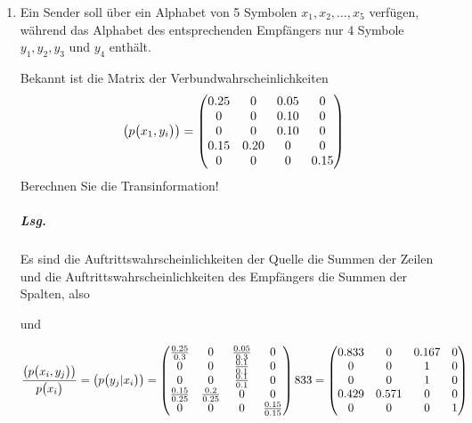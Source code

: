 \documentclass{scrreprt}
\begin{document}
\begin{enumerate}[1.]
\newpage
\setcounter{enumi}{4}
\item Ein Sender soll über ein Alphabet von 5 Symbolen $x_1, x_2, \ldots, x_5$
  verfügen,
  während das Alphabet des entsprechenden Empfängers nur 4 Symbole $y_1, y_2, y_3$
  und $y_4$ enthält.

  Bekannt ist die Matrix der Verbundwahrscheinlichkeiten
  \[
    \qty(p\qty\big(x_1, y_i)) = \begin{pmatrix}
      0.25 & 0    & 0.05 & 0    \\
      0    & 0    & 0.10 & 0    \\
      0    & 0    & 0.10 & 0    \\
      0.15 & 0.20 & 0    & 0    \\
      0    & 0    & 0    & 0.15 \\
    \end{pmatrix}
  \]
  Berechnen Sie die Transinformation!

  \subparagraph{Lsg.} Es sind die Auftrittswahrscheinlichkeiten der Quelle die
  Summen der Zeilen und die Auftrittswahrscheinlichkeiten des Empfängers die
  Summen der Spalten, also
  und

  \[
    \frac{\qty(p\qty\big(x_i, y_j))}{p\qty\big(x_i)} = \qty(p\qty\big(y_j | x_i))
    = \begin{pmatrix}
      \frac{0.25}{0.3}  & 0                & \frac{0.05}{0.3} & 0                 \\
      0                 & 0                & \frac{0.1}{0.1}  & 0                 \\
      0                 & 0                & \frac{0.1}{0.1}  & 0                 \\
      \frac{0.15}{0.25} & \frac{0.2}{0.25} & 0                & 0                 \\
      0                 & 0                & 0                & \frac{0.15}{0.15} \\
    \end{pmatrix}833
    = \begin{pmatrix}
      0.833 & 0     & 0.167 & 0 \\
      0     & 0     & 1     & 0 \\
      0     & 0     & 1     & 0 \\
      0.429 & 0.571 & 0     & 0 \\
      0     & 0     & 0    & 1 \\
    \end{pmatrix}
  \]


\end{enumerate}
\end{document}
